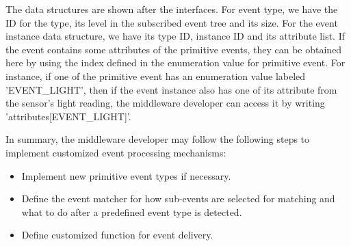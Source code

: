 The data structures are shown after the interfaces. For event type, we have the ID for the type, its level in the subscribed event tree and its size. For the event instance data structure, we have its type ID, instance ID and its attribute list. If the event contains some attributes of the primitive events, they can be obtained here by using the index defined in the enumeration value for primitive event. For instance, if one of the primitive event has an enumeration value labeled 'EVENT\_LIGHT', then if the event instance also has one of its attribute from the sensor's light reading, the middleware developer can access it by writing 'attributes[EVENT\_LIGHT]'.

In summary, the middleware developer may follow the following steps to implement customized event processing mechanisms:
\begin{itemize} 
\item Implement new primitive event types if necessary.
\item Define the event matcher for how sub-events are selected for matching and what to do after a predefined event type is detected.
\item Define customized function for event delivery.
\end{itemize}